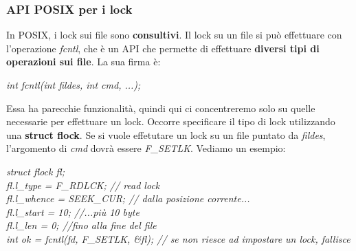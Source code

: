\documentclass[12pt]{article}
\begin{document}
\subsubsection{API POSIX per i lock}
In POSIX, i lock sui file sono \textbf{consultivi}. Il lock su un file si può effettuare con l'operazione \textit{fcntl}, che è un API che permette di effettuare \textbf{diversi tipi di operazioni sui file}. La sua firma è:
\begin{center}
    \textit{int fcntl(int fildes, int cmd, ...);}
\end{center}
Essa ha parecchie funzionalità, quindi qui ci concentreremo solo su quelle necessarie per effettuare un lock.
Occorre specificare il tipo di lock utilizzando una \textbf{struct flock}. Se si vuole effetutare un lock su un file puntato da \textit{fildes}, l'argomento di \textit{cmd} dovrà essere
\textit{F\_SETLK}. Vediamo un esempio:
\begin{center}
    \textit{struct flock fl;} \\
    \textit{fl.l\_type = F\_RDLCK; // read lock} \\
    \textit{fl.l\_whence = SEEK\_CUR; // dalla posizione corrente...} \\
    \textit{fl.l\_start = 10; //...più 10 byte} \\
    \textit{fl.l\_len = 0; //fino alla fine del file} \\
    \textit{int ok = fcntl(fd, F\_SETLK, \textnormal{\&}fl); // se non riesce ad impostare un lock, fallisce}
\end{center}
\end{document}
